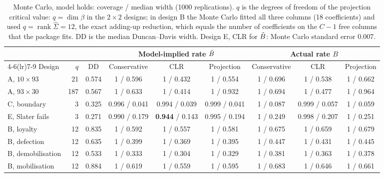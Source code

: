 \begin{table}[t]
\centering\footnotesize
\setlength{\tabcolsep}{3pt}
\begin{tabular}{@{}lrc ccc ccc@{}}
\toprule
& & & \multicolumn{3}{c}{Model-implied rate $\tilde B$} & \multicolumn{3}{c}{Actual rate $B$} \\
\cmidrule(lr){4-6}\cmidrule(lr){7-9}
Design & $q$ & DD & Conservative & CLR & Projection & Conservative & CLR & Projection \\
\midrule
A, $10\times93$ & 21 & 0.574 & 1 / 0.596 & 1 / 0.432 & 1 / 0.554 & 1 / 0.696 & 1 / 0.538 & 1 / 0.662 \\
A, $93\times30$ & 187 & 0.567 & 1 / 0.633 & 1 / 0.414 & 1 / 0.932 & 1 / 0.694 & 1 / 0.477 & 1 / 0.964 \\
C, boundary & 3 & 0.325 & 0.996 / 0.041 & 0.994 / 0.039 & 0.999 / 0.041 & 1 / 0.087 & 0.999 / 0.057 & 1 / 0.059 \\
E, Slater fails & 3 & 0.271 & 0.990 / 0.179 & \textbf{0.944} / 0.143 & 0.995 / 0.194 & 1 / 0.249 & 0.998 / 0.207 & 1 / 0.251 \\
B, loyalty & 12 & 0.835 & 1 / 0.592 & 1 / 0.557 & 1 / 0.581 & 1 / 0.675 & 1 / 0.659 & 1 / 0.679 \\
B, defection & 12 & 0.635 & 1 / 0.399 & 1 / 0.369 & 1 / 0.395 & 1 / 0.447 & 1 / 0.431 & 1 / 0.445 \\
B, demobilisation & 12 & 0.533 & 1 / 0.333 & 1 / 0.304 & 1 / 0.329 & 1 / 0.381 & 1 / 0.363 & 1 / 0.378 \\
B, mobilisation & 12 & 0.884 & 1 / 0.619 & 1 / 0.559 & 1 / 0.595 & 1 / 0.683 & 1 / 0.646 & 1 / 0.661 \\
\bottomrule
\end{tabular}
\caption{Monte Carlo, model holds: coverage / median width (1000 replications). $q$ is the degrees of freedom of the projection critical value: $q=\dim\beta$ in the $2\times2$ designs; in design B the Monte Carlo fitted all three columns (18 coefficients) and used $q=\operatorname{rank}\hat\Sigma=12$, the exact adding-up reduction, which equals the number of coefficients on the $C-1$ free columns that the package fits. DD is the median Duncan--Davis width. Design E, CLR for $\tilde B$: Monte Carlo standard error 0.007.}\label{tab:mc1}
\end{table}

